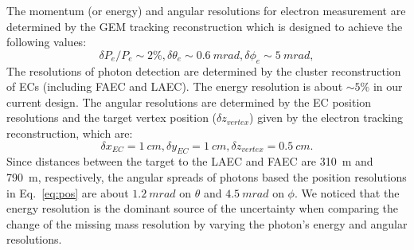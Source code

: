  The momentum (or energy) and angular resolutions for electron measurement are determined by the GEM tracking reconstruction which is designed to achieve the following values:
 \begin{equation*}
    \delta P_{e}/P_{e} \sim 2\%, \delta \theta_{e} \sim 0.6~mrad, \delta\phi_{e} \sim 5~mrad,
 \end{equation*}
The resolutions of photon detection are determined by the cluster reconstruction of ECs (including FAEC and LAEC). The energy resolution is about $\sim 5\%$ in our current design. The angular resolutions are determined by the EC position resolutions and the target vertex position ($\delta z_{vertex}$) given by the electron tracking reconstruction, which are:
\begin{equation}
  \delta x_{EC} = 1~cm, \delta y_{EC} = 1~cm, \delta z_{vertex} = 0.5~cm.
  \label{eq:pos}
\end{equation}
Since distances between the target to the LAEC and FAEC are 310~m and 790~m, respectively, the angular spreads of photons based the position resolutions in Eq.~\ref{eq:pos} are about $1.2~mrad$ on $\theta$ and $4.5~mrad$ on $\phi$. We noticed that the energy resolution is the dominant source of the uncertainty when comparing the change of the missing mass resolution by varying the photon's energy and angular resolutions.

